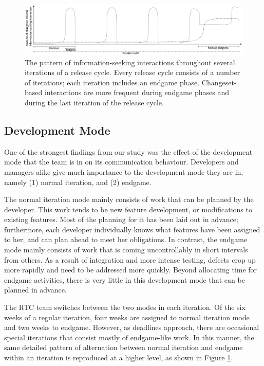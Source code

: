 \documentclass{sig-alternate}
\begin{document}
\begin{figure}[tb]
\centering
\includegraphics[width=\textwidth]{figures/findingProcess}
\caption{The pattern of information-seeking interactions throughout several iterations of a release cycle. Every release cycle consists of a number of iterations; each iteration includes an endgame phase. Changeset-based interactions are more frequent during endgame phases and during the last iteration of the release cycle.}
\label{IterationsFig}
\end{figure}

\pagebreak
\subsection{Development Mode}

One of the strongest findings from our study was the effect of the development mode that the team is in on its communication behaviour. Developers and managers alike give much importance to the development mode they are in, namely (1) normal iteration, and (2) endgame.

The normal iteration mode mainly consists of work that can be planned by the developer. This work tends to be new feature development, or modifications to existing features. Most of the planning for it has been laid out in advance; furthermore, each developer individually knows what features have been assigned to her, and can plan ahead to meet her obligations.
In contrast, the endgame mode mainly consists of work that is coming uncontrollably in short intervals from others. As a result of integration and more intense testing, defects crop up more rapidly and need to be addressed more quickly. Beyond allocating time for endgame activities, there is very little in this development mode that can be planned in advance.

The RTC team switches between the two modes in each iteration. Of the six weeks of a regular iteration, four weeks are assigned to normal iteration mode and two weeks to endgame. However, as deadlines approach, there are occasional special iterations that consist mostly of endgame-like work. In this manner, the same detailed pattern of alternation between normal iteration and endgame within an iteration is reproduced at a higher level, as shown in Figure \ref{IterationsFig}.
\end{document}
